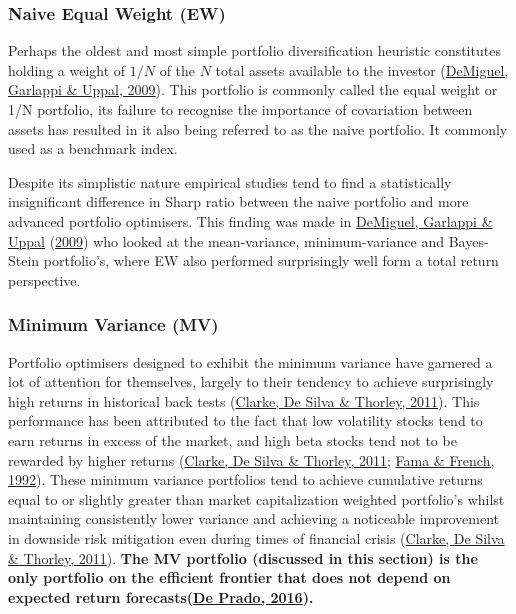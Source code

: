 \documentclass[11pt,preprint, authoryear]{elsarticle}
\numberwithin{equation}{section}
\numberwithin{figure}{section}
\numberwithin{table}{section}
\begin{document}
\hypertarget{naive-equal-weight-ew}{%
\subsubsection{Naive Equal Weight (EW)}\label{naive-equal-weight-ew}}

Perhaps the oldest and most simple portfolio diversification heuristic
constitutes holding a weight of \(1/N\) of the \(N\) total assets
available to the investor
(\protect\hyperlink{ref-demiguel2009}{DeMiguel, Garlappi \& Uppal,
2009}). This portfolio is commonly called the equal weight or 1/N
portfolio, its failure to recognise the importance of covariation
between assets has resulted in it also being referred to as the naive
portfolio. It commonly used as a benchmark index.

Despite its simplistic nature empirical studies tend to find a
statistically insignificant difference in Sharp ratio between the naive
portfolio and more advanced portfolio optimisers. This finding was made
in \protect\hyperlink{ref-demiguel2009}{DeMiguel, Garlappi \& Uppal}
(\protect\hyperlink{ref-demiguel2009}{2009}) who looked at the
mean-variance, minimum-variance and Bayes-Stein portfolio's, where EW
also performed surprisingly well form a total return perspective.

\hypertarget{minimum-variance-mv}{%
\subsubsection{Minimum Variance (MV)}\label{minimum-variance-mv}}

Portfolio optimisers designed to exhibit the minimum variance have
garnered a lot of attention for themselves, largely to their tendency to
achieve surprisingly high returns in historical back tests
(\protect\hyperlink{ref-clarke2011}{Clarke, De Silva \& Thorley, 2011}).
This performance has been attributed to the fact that low volatility
stocks tend to earn returns in excess of the market, and high beta
stocks tend not to be rewarded by higher returns
(\protect\hyperlink{ref-clarke2011}{Clarke, De Silva \& Thorley, 2011};
\protect\hyperlink{ref-fama1992}{Fama \& French, 1992}). These minimum
variance portfolios tend to achieve cumulative returns equal to or
slightly greater than market capitalization weighted portfolio's whilst
maintaining consistently lower variance and achieving a noticeable
improvement in downside risk mitigation even during times of financial
crisis (\protect\hyperlink{ref-clarke2011}{Clarke, De Silva \& Thorley,
2011}). \textbf{The MV portfolio (discussed in this section) is the only
portfolio on the efficient frontier that does not depend on expected
return forecasts(\protect\hyperlink{ref-lopez}{De Prado, 2016}).}
\end{document}

